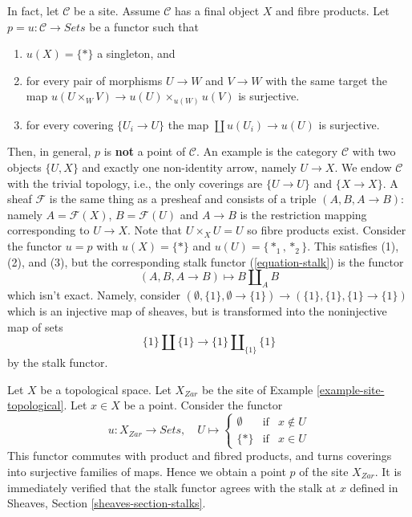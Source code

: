 \begin{remark}
\label{remark-improve-proposition-points-limits}
In fact, let $\mathcal{C}$ be a site. Assume $\mathcal{C}$ has a final object
$X$  and fibre products. Let $p = u: \mathcal{C} \to \textit{Sets}$ be a
functor such that
\begin{enumerate}
\item $u(X) = \{*\}$ a singleton, and
\item for every pair of morphisms $U \to W$ and $V \to W$ with
the same target the map
$u(U \times_W V) \to u(U) \times_{u(W)} u(V)$ is surjective.
\item for every covering $\{U_i \to U\}$ the map
$\coprod u(U_i) \to u(U)$ is surjective.
\end{enumerate}
Then, in general, $p$ is {\bf not} a point of $\mathcal{C}$.
An example is the category $\mathcal{C}$ with two objects $\{U, X\}$
and exactly one non-identity arrow, namely $U \to X$. We endow $\mathcal{C}$
with the trivial topology, i.e., the only coverings are $\{U \to U\}$ and
$\{X \to X\}$. A sheaf $\mathcal{F}$ is the same thing as a presheaf and
consists of a triple $(A, B, A \to B)$: namely $A = \mathcal{F}(X)$,
$B = \mathcal{F}(U)$ and $A \to B$ is the restriction mapping corresponding
to $U \to X$. Note that $U \times_X U = U$ so fibre products exist.
Consider the functor $u = p$ with $u(X) = \{*\}$ and $u(U) = \{*_1, *_2\}$.
This satisfies (1), (2), and (3), but the corresponding stalk functor
(\ref{equation-stalk}) is the functor
$$
(A, B, A \to B) \longmapsto B \amalg_A B
$$
which isn't exact. Namely, consider
$(\emptyset, \{1\}, \emptyset \to \{1\}) \to (\{1\}, \{1\}, \{1\} \to \{1\})$
which is an injective map of sheaves, but is transformed into the noninjective
map of sets
$$
\{1\} \amalg \{1\} \longrightarrow \{1\} \amalg_{\{1\}} \{1\}
$$
by the stalk functor.
\end{remark}

\begin{example}
\label{example-point-topological}
Let $X$ be a topological space. Let $X_{Zar}$ be the site of
Example \ref{example-site-topological}.
Let $x \in X$ be a point. Consider the functor
$$
u : X_{Zar} \longrightarrow \textit{Sets}, \quad
U \mapsto
\left\{
\begin{matrix}
\emptyset & \text{if} & x \not \in U \\
\{*\} & \text{if} & x \in U
\end{matrix}
\right.
$$
This functor commutes with product and fibred products,
and turns coverings into surjective families of maps.
Hence we obtain a point $p$ of the site $X_{Zar}$.
It is immediately verified that the stalk functor
agrees with the stalk at $x$ defined in
Sheaves, Section
\ref{sheaves-section-stalks}.
\end{example}

